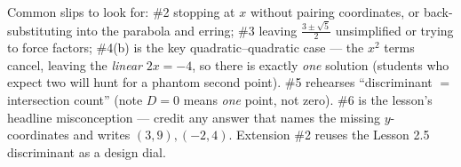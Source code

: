 \documentclass[10pt]{article}
\begin{document}
\begin{teachernote}[Homework]
Common slips to look for: \#2 stopping at $x$ without pairing coordinates, or back-substituting into the parabola and
erring; \#3 leaving $\frac{3\pm\sqrt5}{2}$ unsimplified or trying to force factors; \#4(b) is the key
quadratic--quadratic case --- the $x^2$ terms cancel, leaving the \emph{linear} $2x=-4$, so there is exactly
\emph{one} solution (students who expect two will hunt for a phantom second point). \#5 rehearses ``discriminant $=$
intersection count'' (note $D=0$ means \emph{one} point, not zero). \#6 is the lesson's headline misconception ---
credit any answer that names the missing $y$-coordinates and writes $(3,9),(-2,4)$. Extension \#2 reuses the
Lesson 2.5 discriminant as a design dial.
\end{teachernote}
\end{document}
